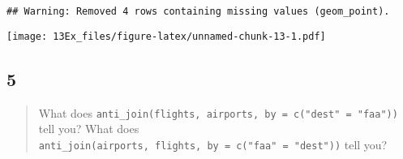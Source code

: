 \documentclass[]{ltjsarticle}
\begin{document}
\begin{verbatim}
## Warning: Removed 4 rows containing missing values (geom_point).
\end{verbatim}

\texttt{[image: 13Ex\_files/figure-latex/unnamed-chunk-13-1.pdf]}

\hypertarget{section-22}{%
\subsection{5}\label{section-22}}

\begin{quote}
What does
\texttt{anti\_join(flights,\ airports,\ by\ =\ c("dest"\ =\ "faa"))}
tell you? What does
\texttt{anti\_join(airports,\ flights,\ by\ =\ c("faa"\ =\ "dest"))}
tell you?
\end{quote}
\end{document}
